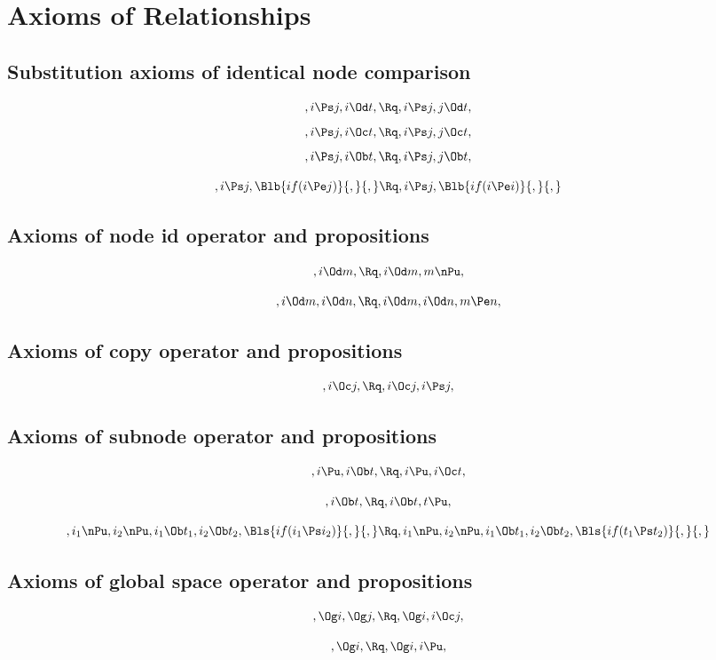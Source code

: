 \section{Axioms of Relationships}

\subsection{Substitution axioms of identical node comparison}

\[,i \Ps j, i \Od t, \Rq , i \Ps j, j \Od t,\]
\[,i \Ps j, i \Oc t, \Rq , i \Ps j, j \Oc t,\]
\[,i \Ps j, i \Ob t, \Rq , i \Ps j, j \Ob t,\]
\bigskip
\bigskip

\[,i \Ps j, \Blb{if(i \Pe j)}{,}{,} \Rq , i \Ps j, \Blb{if(i \Pe i)}{,}{,}\]



\bigskip
\bigskip
\bigskip
\bigskip
\subsection{ Axioms of node id operator and propositions}
\[, i \Od m, \Rq , i \Od m, m \nPu,\]

\[, i \Od m, i \Od n, \Rq , i \Od m, i \Od n, m \Pe n,\]

\bigskip
\bigskip
\bigskip
\bigskip
\subsection{ Axioms of copy operator and propositions}
\[, i \Oc j , \Rq , i \Oc j , i \Ps j,\]

\bigskip
\bigskip
\bigskip
\bigskip
\subsection{ Axioms of subnode operator and propositions}
\[,i \Pu, i \Ob t, \Rq , i \Pu, i \Oc t,\]

\[, i \Ob t, \Rq ,i \Ob t, t \Pu,\]

\[,i_1 \nPu, i_2 \nPu, i_1 \Ob t_1, i_2 \Ob t_2, \Bls{if(i_1 \Ps i_2)}{,}{,} \Rq ,i_1 \nPu, i_2 \nPu, i_1 \Ob t_1, i_2 \Ob t_2, \Bls{if(t_1 \Ps t_2)}{,}{,}\]


\bigskip
\bigskip
\bigskip
\bigskip
\subsection{ Axioms of global space operator and propositions}
\[,\Og i, \Og j, \Rq , \Og i, i \Oc j,\]


\[, \Og i, \Rq , \Og i, i \Pu ,\]


